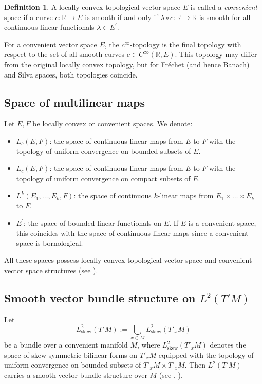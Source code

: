 \documentclass[11pt,reqno]{amsart}
\theoremstyle{definition}
\newtheorem{definition}[theorem]{Definition}
\numberwithin{equation}{section}
\begin{document}
\begin{definition}
A locally convex topological vector space $E$ is called a \textit{convenient} space if a curve $c: \mathbb{R} \rightarrow E$ is smooth if and only if $\lambda \circ c: \mathbb{R} \rightarrow \mathbb{R}$ is smooth for all continuous linear functionals $\lambda \in E^{\prime}$.
\end{definition}

For a convenient vector space $E$, the $c^{\infty}$-topology is the final topology with respect to the set of all smooth curves $c \in C^{\infty}(\mathbb{R}, E)$. This topology may differ from the original locally convex topology, but for Fréchet (and hence Banach) and Silva spaces, both topologies coincide.

\subsection{Space of multilinear maps}
Let $E, F$ be locally convex or convenient spaces. We denote:
\begin{itemize}
    \item $L_{b}(E, F)$: the space of continuous linear maps from $E$ to $F$ with the topology of uniform convergence on bounded subsets of $E$.
    \item $L_{c}(E, F)$: the space of continuous linear maps from $E$ to $F$ with the topology of uniform convergence on compact subsets of $E$.
    \item $L^{k}(E_{1}, \dots, E_{k}, F)$: the space of continuous $k$-linear maps from $E_{1} \times \dots \times E_{k}$ to $F$.
    \item $E^{\prime}$: the space of bounded linear functionals on $E$. If $E$ is a convenient space, this coincides with the space of continuous linear maps since a convenient space is bornological.
\end{itemize}
All these spaces possess locally convex topological vector space and convenient vector space structures (see \cite[Proposition 5.6]{20}).

\subsection{Smooth vector bundle structure on $L^{2}(T'M)$}
Let
\[
L^2_{\text{skew}}(T'M) := \bigcup_{x\in M} L^2_{\text{skew}}(T'_{x}M)
\]
be a bundle over a convenient manifold $M$, where $L^2_{\text{skew}}(T'_xM)$ denotes the space of skew-symmetric bilinear forms on $T'_xM$ equipped with the topology of uniform convergence on bounded subsets of $T'_xM\times T'_xM$. Then $L^{2}(T'M)$ carries a smooth vector bundle structure over $M$ (see \cite[Section 33]{20}, \cite[Section 1.1, 3.1]{24}).
\end{document}

